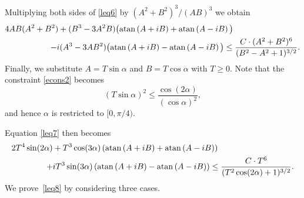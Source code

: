 \documentclass[11pt]{article}
\def\({\left(} \def\){\right)} \def\hatU{\widehat{U}}
\begin{document}
Multiplying both sides of \eqref{leq6} by $(A^2+B^2)^3/(AB)^3$ we obtain
\begin{equation}\label{leq7}
\begin{split}
4AB(A^2+B^2)+
(B^3-3A^2B)\big({\rm atan}\(A+iB\)+{\rm atan}\(A-iB\)\big)\phantom{XXXXXXXXX}\\
-i(A^3-3AB^2)\big({\rm atan}\(A+iB\)-{\rm atan}\(A-iB\)\big)
\leq \frac{C\cdot (A^2+B^2)^6}{(B^2-A^2+1)^{3/2}}.
\end{split}
\end{equation}
Finally, we substitute $A=T\sin\alpha$ and $B=T\cos\alpha$ with $T\geq 0$.
Note that the constraint \eqref{econs2} becomes
\begin{equation}\label{econs3}
(T\sin\alpha)^2\leq \frac{\cos(2\alpha)}{(\cos\alpha)^2},
\end{equation}
and hence $\alpha$ is restricted to $[0,\pi/4)$.

Equation \eqref{leq7} then becomes
\begin{equation}\label{leq8}
\begin{split}
2T^4\sin(2\alpha)+
T^3\cos(3\alpha)\({\rm atan}\(A+iB\)+{\rm atan}\(A-iB\)\)\phantom{XXXXXXXXXX}\\
+iT^3\sin(3\alpha)\({\rm atan}\(A+iB\)-{\rm atan}\(A-iB\)\)
\leq \frac{C\cdot T^6}{(T^2\cos(2\alpha)+1)^{3/2}}.
\end{split}
\end{equation}
We prove~\eqref{leq8} by considering three cases.
\end{document}
